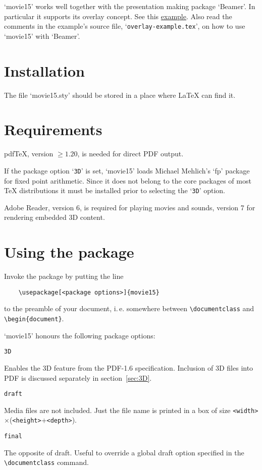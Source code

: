 \documentclass[a4paper]{article}
\begin{document}
`movie15' works well together with the presentation making package `Beamer'. In particular it supports its overlay concept. See this \href{./overlay-example.pdf}{example}.
Also read the comments in the example's source file, `\verb+overlay-example.tex+', on how to use `movie15' with `Beamer'.

\section{Installation}
The file `movie15.sty' should be stored in a place where \LaTeX{} can find it.

\section{Requirements}
pdf\TeX{}, version $\ge1.20$, is needed for direct PDF output.

If the package option `\verb+3D+' is set, `movie15' loads Michael Mehlich's `fp' package for fixed point arithmetic. Since it does not belong to the core packages of most \TeX{} distributions it must be installed prior to selecting the `\verb+3D+' option.

Adobe Reader, version 6, is required for playing movies and sounds, version 7 for rendering embedded 3D content.

\section{Using the package}
Invoke the package by putting the line
\begin{verbatim}
    \usepackage[<package options>]{movie15}
\end{verbatim}
to the preamble of your document, i.\,e. somewhere between \verb+\documentclass+ and \verb+\begin{document}+.

`movie15' honours the following package options:
\begin{verbatim}
3D
\end{verbatim}
Enables the 3D feature from the PDF-1.6 specification. Inclusion of 3D files into PDF is discussed separately in section~\ref{sec:3D}.

\begin{verbatim}
draft
\end{verbatim}
Media files are not included. Just the file name is printed in a box of size \verb+<width>+$\times$(\verb+<height>++\verb+<depth>+).
\begin{verbatim}
final
\end{verbatim}
The opposite of draft. Useful to override a global draft option specified
in the \verb+\documentclass+ command.
\end{document}
